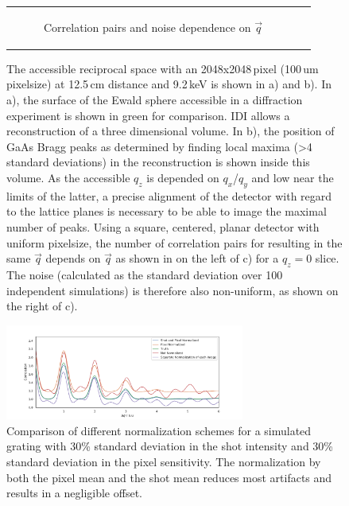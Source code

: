 \begin{figure}
\begin{tabular}[t]{cc}
\begin{subfigure}{0.52\textwidth}
			\caption{Correlation pairs and noise dependence on $\vec{q}$ } 
		\end{subfigure}\\
	\end{tabular}
	\caption[Accessible reciprocal space]{The accessible reciprocal space with an 2048x2048\,pixel (100\,um pixelsize) at 12.5\,cm distance and 9.2\,keV is shown in a) and b). In a), the surface of the Ewald sphere accessible in a diffraction experiment is shown in green for comparison. IDI allows a reconstruction of a three dimensional volume. In b), the position of GaAs Bragg peaks as determined by finding local maxima (>4 standard deviations) in the reconstruction is shown inside this volume. As the accessible $q_z$ is depended on $q_x$/$q_y$ and low near the limits of the latter, a precise alignment of the detector with regard to the lattice planes is necessary to be able to image the maximal number of peaks. Using a square, centered, planar detector with uniform pixelsize, the number of correlation pairs for resulting in the same $\vec{q}$ depends on $\vec{q}$ as shown in on the left of c) for a $q_z=0$ slice. The noise (calculated as the standard deviation over 100 independent simulations) is therefore also non-uniform, as shown on the right of c).}
	
\end{figure}

\begin{figure}
	\centering
	\includegraphics[width=0.7\textwidth]{images/normalisation_comp.pdf}
	\caption[Comparison of Normalization Techniques]{Comparison of different normalization schemes for a simulated grating with 30\% standard deviation in the shot intensity and 30\% standard deviation in the pixel sensitivity. The normalization by both the pixel mean and the shot mean reduces most artifacts and results in a negligible offset.}
	\label{fig:norm_com[]}
\end{figure}

